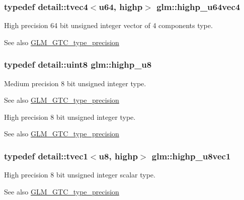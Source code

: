 \subsubsection[{\texorpdfstring{highp\+\_\+u64vec4}{highp_u64vec4}}]{\setlength{\rightskip}{0pt plus 5cm}typedef detail\+::tvec4$<$u64, highp$>$ {\bf glm\+::highp\+\_\+u64vec4}}\hypertarget{group__gtc__type__precision_ga8aa6fc9f16dfa3078d411f6361188a45}{}\label{group__gtc__type__precision_ga8aa6fc9f16dfa3078d411f6361188a45}
High precision 64 bit unsigned integer vector of 4 components type. \begin{DoxySeeAlso}{See also}
\hyperlink{group__gtc__type__precision}{G\+L\+M\+\_\+\+G\+T\+C\+\_\+type\+\_\+precision} 
\end{DoxySeeAlso}
\subsubsection[{\texorpdfstring{highp\+\_\+u8}{highp_u8}}]{\setlength{\rightskip}{0pt plus 5cm}typedef detail\+::uint8 {\bf glm\+::highp\+\_\+u8}}\hypertarget{group__gtc__type__precision_ga8a60abe782749c504fb5ae51eb8b49cc}{}\label{group__gtc__type__precision_ga8a60abe782749c504fb5ae51eb8b49cc}
Medium precision 8 bit unsigned integer type. \begin{DoxySeeAlso}{See also}
\hyperlink{group__gtc__type__precision}{G\+L\+M\+\_\+\+G\+T\+C\+\_\+type\+\_\+precision}
\end{DoxySeeAlso}
High precision 8 bit unsigned integer type. \begin{DoxySeeAlso}{See also}
\hyperlink{group__gtc__type__precision}{G\+L\+M\+\_\+\+G\+T\+C\+\_\+type\+\_\+precision} 
\end{DoxySeeAlso}
\subsubsection[{\texorpdfstring{highp\+\_\+u8vec1}{highp_u8vec1}}]{\setlength{\rightskip}{0pt plus 5cm}typedef detail\+::tvec1$<$u8, highp$>$ {\bf glm\+::highp\+\_\+u8vec1}}\hypertarget{group__gtc__type__precision_ga8e7e9156357a2b748fe39702c3bdbeec}{}\label{group__gtc__type__precision_ga8e7e9156357a2b748fe39702c3bdbeec}
High precision 8 bit unsigned integer scalar type. \begin{DoxySeeAlso}{See also}
\hyperlink{group__gtc__type__precision}{G\+L\+M\+\_\+\+G\+T\+C\+\_\+type\+\_\+precision} 
\end{DoxySeeAlso}
